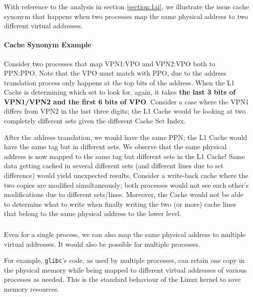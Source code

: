 \documentclass[12pt]{article}
\begin{document}
\subsubsection{}

With reference to the analysis in section \ref{section:1ai}, we illustrate the issue cache synonym that happens when two processes map the same physical address to two different virtual addresses.

\paragraph*{Cache Synonym Example}

Consider two processes that map VPN1:VPO and VPN2:VPO both to PPN:PPO. Note that the VPO must match with PPO, due to the address translation process only happens at the top bits of the address. When the L1 Cache is determining which set to look for, again, it takes \textbf{the last 3 bits of VPN1/VPN2 and the first 6 bits of VPO}. Consider a case where the VPN1 differs from VPN2 in the last three digits; the L1 Cache would be looking at two completely different sets given the different Cache Set Index.

After the address translation, we would have the same PPN; the L1 Cache would have the same tag but in different sets. We observe that the same physical address is now mapped to the same tag but different sets in the L1 Cache! Same data getting cached in several different sets (and different lines due to set difference) would yield unexpected results. Consider a write-back cache where the two copies are modified simultaneously; both processes would not see each other's modifications due to different sets/lines. Moreover, the Cache would not be able to determine what to write when finally writing the two (or more) cache lines that belong to the same physical address to the lower level.

\subsubsection{}

Even for a single process, we can also map the same physical address to multiple virtual addresses. It would also be possible for multiple processes.

For example, \texttt{glibc}'s code, as used by multiple processes, can retain one copy in the physical memory while being mapped to different virtual addresses of various processes as needed. This is the standard behaviour of the Linux kernel to save memory resources.
\end{document}
